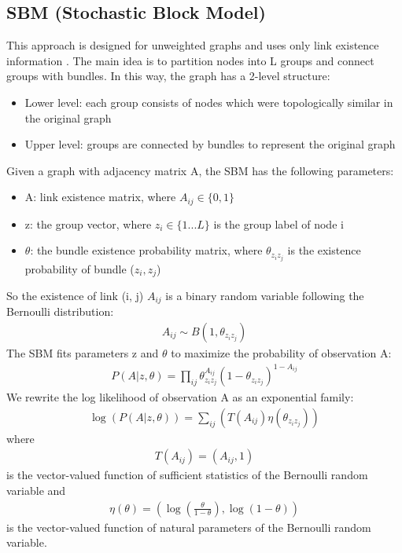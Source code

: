 \documentclass[book,12pt]{WSUThesis}
\theoremstyle{definition}
\begin{document}
\subsection{SBM (Stochastic Block Model)}
This approach is designed for unweighted graphs and uses only link existence information \cite{holland1983stochastic}.
The main idea is to partition nodes into L groups and connect groups with bundles.
In this way, the graph has a 2-level structure:
\begin{itemize}
	\item Lower level: each group consists of nodes which were topologically similar in the original graph
	\item Upper level: groups are connected by bundles
	to represent the original graph
\end{itemize}
Given a graph with adjacency matrix A, the SBM has the following parameters:
\begin{itemize}
	\item A: link existence matrix, where $ A_{ij} \in \{0, 1\} $
	\item z: the group vector,
	where $ z_i \in \{ 1 ... L \} $ is the group label of node i
	\item $ \theta $: the bundle existence probability matrix,
	where $ \theta_{z_i z_j} $ is the existence probability of bundle ($z_i, z_j$)
\end{itemize}
So the existence of link (i, j) $ A_{ij} $ is a binary random variable following the Bernoulli distribution:
\begin{align*}
A_{ij} \sim B(1, \theta_{z_i z_j})
\end{align*}
The SBM fits parameters z and $ \theta $
to maximize the probability of observation A:
\begin{align*}
P(A|z, \theta) 
= \prod_{ij} \theta_{z_i z_j}^{A_{ij}}(1-\theta_{z_i z_j})^{1-A_{ij}}
\end{align*}
We rewrite the log likelihood of observation A as an exponential family:
\begin{align*}
\log(P(A|z, \theta))
= \sum_{ij} (
T(A_{ij}) \eta(\theta_{z_i z_j})
)
\end{align*}
where
\begin{align*}
T(A_{ij}) = (A_{ij}, 1)
\end{align*}
is the vector-valued function of sufficient statistics of the Bernoulli random variable and
\begin{align*}
\eta(\theta) = ( \log(\frac{\theta}{1-\theta}), \log(1-\theta) )
\end{align*}
is the vector-valued function of natural parameters of the Bernoulli random variable.
\end{document}
